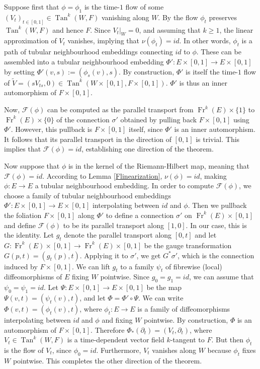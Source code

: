\documentclass[10pt]{amsart}
\newcommand{\F}{{\mathcal{F}}}
\newcommand{\Tan}{{\operatorname{Tan}}}
\newcommand{\Fr}{{\operatorname{Fr}}}
\numberwithin{theoremalpha}{section}
\numberwithin{equation}{section}
\numberwithin{definition}{section}
\numberwithin{theorem}{section}
\numberwithin{proposition}{section}
\numberwithin{lemma}{section}
\numberwithin{example}{section}
\numberwithin{remark}{section}
\numberwithin{corollary}{section}
\numberwithin{question}{section}
\numberwithin{problem}{section}
\numberwithin{assumption}{section}
\theoremstyle{named}
\numberwithin{equation}{section}
\begin{document}
Suppose first that $\phi = \phi_{1}$ is the time-$1$ flow of some $(V_t)_{t \in [0,1]} \in \Tan^{k}(W,F)$ vanishing along $W$. By \cite[Proposition 1.6]{AS09} the flow $\phi_{t}$ preserves $\Tan^{k}(W, F)$ and hence $F$. Since $V_{t}|_{W} = 0$, and assuming that $k \geq 1$, the linear approximation of $V_{t}$ vanishes, implying that $\nu(\phi_{t}) = id$. In other words, $\phi_{t}$ is a path of tubular neighbourhood embeddings connecting $id$ to $\phi$. These can be assembled into a tubular neighbourhood embedding $\Phi' : E \times [0,1] \to E \times [0,1]$ by setting $\Phi'(v,s) := (\phi_s(v),s)$. By construction, $\Phi'$ is itself the time-$1$ flow of $\tilde{V} = (sV_{ts},0) \in \Tan^{k}(W \times [0,1],F \times [0,1])$. $\Phi'$ is thus an inner automorphism of $F \times [0,1]$.

Now, $\F(\phi)$ can be computed as the parallel transport from $\Fr^k(E) \times \{ 1 \}$ to $\Fr^{k}(E) \times \{0\}$ of the connection $\sigma'$ obtained by pulling back $F \times [0,1]$ using $\Phi'$. However, this pullback is $F \times [0,1]$ itself, since $\Phi'$ is an inner automorphism. It follows that its parallel transport in the direction of $[0,1]$ is trivial. This implies that $\F(\phi) = id$, establishing one direction of the theorem. 

Now suppose that $\phi$ is in the kernel of the Riemann-Hilbert map, meaning that $\F(\phi) = id$. According to Lemma \ref{Flinearization}, $\nu(\phi) = id$, making $\phi : E \to E$ a tubular neighbourhood embedding. In order to compute $\F(\phi)$, we choose a family of tubular neighbourhood embeddings $\Phi' : E \times [0,1] \to E \times [0,1]$ interpolating between $id$ and $\phi$. Then we pullback the foliation $F \times [0,1]$ along $\Phi'$ to define a connection $\sigma'$ on $\Fr^k(E) \times [0,1]$ and define $\F(\phi)$ to be its parallel transport along $[1,0]$. In our case, this is the identity. Let $g_{t}$ denote the parallel transport along $[0,t]$ and let $G: \Fr^{k}(E) \times [0,1] \to \Fr^{k}(E) \times [0,1]$ be the gauge transformation $G(p,t) = (g_t(p),t)$. Applying it to $\sigma'$, we get $G^{*} \sigma'$, which is the connection induced by $F \times [0,1]$. We can lift $g_{t}$ to a family $\psi_{t}$ of fibrewise (local) diffeomorphisms of $E$ fixing $W$ pointwise. Since $g_{0} = g_{1} = id$, we can assume that $\psi_{0} = \psi_{1} = id$. Let $\Psi : E \times [0,1] \to E \times [0,1]$ be the map $\Psi(v,t) = (\psi_{t}(v),t)$, and let $\Phi = \Phi' \circ \Psi$. We can write $\Phi(v,t) = (\phi_{t}(v),t)$, where $\phi_{t} : E \to E$ is a family of diffeomorphisms interpolating between $id$ and $\phi$ and fixing $W$ pointwise. By construction, $\Phi$ is an automorphism of $F \times [0,1]$. Therefore $\Phi_{*}(\partial_{t}) = (V_{t}, \partial_{t})$, where $V_{t} \in \Tan^{k}(W,F)$ is a time-dependent vector field $k$-tangent to $F$. But then $\phi_{t}$ is the flow of $V_{t}$, since $\phi_0 = id$. Furthermore, $V_{t}$ vanishes along $W$ because $\phi_{t}$ fixes $W$ pointwise. This completes the other direction of the theorem.  \hfill\qedsymbol
\end{document}

